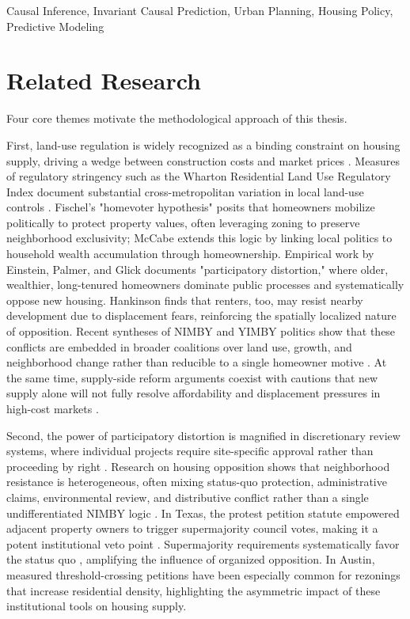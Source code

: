 \documentclass[twoside,11pt]{article}
\begin{document}
\begin{keywords}
  Causal Inference, Invariant Causal Prediction, Urban Planning, Housing Policy, Predictive Modeling
\end{keywords}

\section{Related Research}
Four core themes motivate the methodological approach of this thesis.

First, land-use regulation is widely recognized as a binding constraint on housing supply, driving a wedge between construction costs and market prices \cite{glaeser2005manhattan, glaeser2003zoning, gyourko2015regulation,quigley2005effects}. Measures of regulatory stringency such as the Wharton Residential Land Use Regulatory Index document substantial cross-metropolitan variation in local land-use controls \cite{gyourko2008wrluri,gyourko2021local}. Fischel's "homevoter hypothesis" \cite{fischel2001homevoter} posits that homeowners mobilize politically to protect property values, often leveraging zoning to preserve neighborhood exclusivity; McCabe \cite{mccabe2016} extends this logic by linking local politics to household wealth accumulation through homeownership. Empirical work by Einstein, Palmer, and Glick \cite{einstein2019book} documents "participatory distortion," where older, wealthier, long-tenured homeowners dominate public processes and systematically oppose new housing. Hankinson \cite{hankinson2018} finds that renters, too, may resist nearby development due to displacement fears, reinforcing the spatially localized nature of opposition. Recent syntheses of NIMBY and YIMBY politics show that these conflicts are embedded in broader coalitions over land use, growth, and neighborhood change rather than reducible to a single homeowner motive \cite{brouwer2024nimbys}. At the same time, supply-side reform arguments coexist with cautions that new supply alone will not fully resolve affordability and displacement pressures in high-cost markets \cite{hamilton2023reform,been2019supply}.

Second, the power of participatory distortion is magnified in discretionary review systems, where individual projects require site-specific approval rather than proceeding by right \cite{manville2016unpermitted, hills2011zoning}. Research on housing opposition shows that neighborhood resistance is heterogeneous, often mixing status-quo protection, administrative claims, environmental review, and distributive conflict rather than a single undifferentiated NIMBY logic \cite{pendall1999opposition,schively2007nimby}. In Texas, the protest petition statute empowered adjacent property owners to trigger supermajority council votes, making it a potent institutional veto point \cite{texas211006,furth2023invisible}. Supermajority requirements systematically favor the status quo \cite{cellini2010schools}, amplifying the influence of organized opposition. In Austin, measured threshold-crossing petitions have been especially common for rezonings that increase residential density, highlighting the asymmetric impact of these institutional tools on housing supply.
\end{document}
